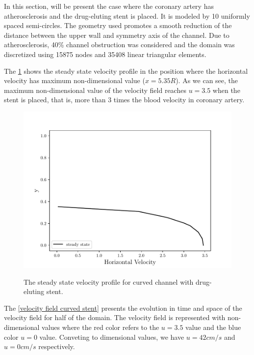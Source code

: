 In this section, will be present
the case where the coronary 
artery has atherosclerosis and 
the drug-eluting stent is placed. 
It is modeled by 10 uniformly spaced 
semi-circles. 
The geometry used promotes a smooth reduction of the 
distance between the upper wall and symmetry axis of the channel. 
Due to atherosclerosis, 40\% channel obstruction was considered 
and the domain was discretized using 15875 nodes and 35408 
linear triangular elements. 

\par 
The \ref{velocity evolution curved stent} shows the steady state velocity 
profile in the position where the horizontal velocity has maximum
non-dimensional value ($x=5.35R$). 
As we can see, the maximum non-dimensional value of the velocity field 
reaches $u=3.5$ when the stent is placed, that is, 
more than 3 times the blood velocity
in coronary artery.

\begin{figure}[H]
     \centering
     \includegraphics[scale=1]{./02_chaps/cap_solution/figure/vel_CurvedStrut_evol.pdf}\\
     \caption{
The steady state velocity profile for curved channel with drug-eluting stent.}
     \label{velocity evolution curved stent}
\end{figure}

\newpage
The \ref{velocity field curved stent} presents the evolution in 
time and space of the velocity field for half of the domain. 
The velocity field is represented with non-dimensional values 
where the red color refers to the $u=3.5$ value and the blue color 
$u=0$ value. Conveting to dimensional values, 
we have $u=42cm/s$ and $u=0cm/s$ respectively.

